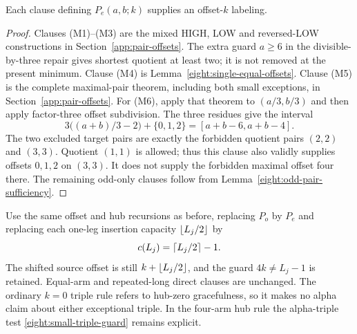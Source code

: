 \begin{lemma}\label{eight:mixed-pair-sufficiency}
Each clause defining $P_e(a,b;k)$ supplies an offset-$k$ labeling.
\end{lemma}
\begin{proof}
Clauses (M1)--(M3) are the mixed HIGH, LOW and reversed-LOW
constructions in Section~\ref{app:pair-offsets}.  The extra guard
$a\ge6$ in the divisible-by-three repair gives shortest quotient at
least two; it is not removed at the present minimum.  Clause (M4)
is Lemma~\ref{eight:single-equal-offsets}.  Clause (M5) is the complete
maximal-pair theorem, including both small exceptions, in
Section~\ref{app:pair-offsets}.  For (M6), apply that theorem to
$(a/3,b/3)$ and then apply factor-three offset subdivision.  The
three residues give the interval
\[
 3\bigl((a+b)/3-2\bigr)+\{0,1,2\}
   =[a+b-6,a+b-4].
\]
The two excluded target pairs are exactly the forbidden quotient pairs
$(2,2)$ and $(3,3)$.  Quotient $(1,1)$ is allowed; thus this clause
also validly supplies offsets $0,1,2$ on $(3,3)$.  It does not supply
the forbidden maximal offset four there.  The remaining odd-only
clauses follow from Lemma~\ref{eight:odd-pair-sufficiency}.
\end{proof}

Use the same offset and hub recursions as before, replacing $P_o$ by
$P_e$ and replacing each one-leg insertion capacity
$\left\lfloor L_j/2\right\rfloor$ by
\[
 c(L_j)=\left\lceil L_j/2\right\rceil-1.
\]
The shifted source offset is still $k+\left\lfloor L_j/2\right\rfloor$, and the guard
$4k\ne L_j-1$ is retained.  Equal-arm and repeated-long direct clauses
are unchanged.  The ordinary $k=0$ triple rule refers to hub-zero
gracefulness, so it makes no alpha claim about either exceptional
triple.  In the four-arm hub rule the alpha-triple test
\eqref{eight:small-triple-guard} remains explicit.

